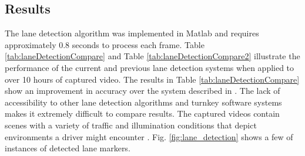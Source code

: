 \documentclass{article}
\begin{document}
\subsection{Results}
The lane detection algorithm was implemented in Matlab and requires
approximately 0.8 seconds to process each frame.
Table \ref{tab:laneDetectionCompare} and Table \ref{tab:laneDetectionCompare2} illustrate the performance of the current and previous lane detection systems when applied to over 10 hours of captured video. The results in Table \ref{tab:laneDetectionCompare} show an improvement in accuracy over the system described in \cite{borkar_layered_2009}. The lack of accessibility to other lane detection algorithms and turnkey software systems makes it extremely difficult to compare results.
The captured videos contain scenes with a variety of traffic and illumination conditions that depict environments a driver might encounter \cite{borkar_layered_2009}. Fig. \ref{fig:lane_detection} shows a few of instances of detected lane markers.
\end{document}
